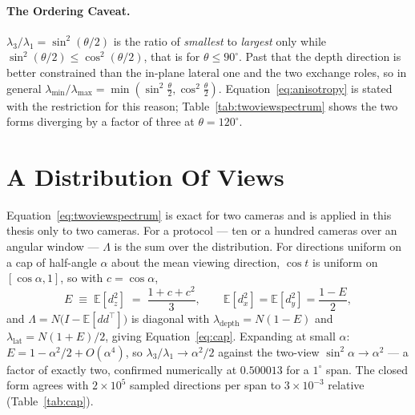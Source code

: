 \paragraph{The Ordering Caveat.} $\lambda_3/\lambda_1 = \sin^2(\theta/2)$ is the
ratio of \emph{smallest} to \emph{largest} only while
$\sin^2(\theta/2) \le \cos^2(\theta/2)$, that is for $\theta \le 90^\circ$. Past
that the depth direction is better constrained than the in-plane lateral one and
the two exchange roles, so in general
$\lambda_{\min}/\lambda_{\max} = \min(\sin^2\tfrac\theta2, \cos^2\tfrac\theta2)$.
Equation~\eqref{eq:anisotropy} is stated with the restriction for this reason;
Table~\ref{tab:twoviewspectrum} shows the two forms diverging by a factor of
three at $\theta = 120^\circ$.

\section{A Distribution Of Views}
\label{app:cap}
Equation~\eqref{eq:twoviewspectrum} is exact for two cameras and is applied in
this thesis only to two cameras. For a protocol --- ten or a hundred cameras over
an angular window --- $\Lambda$ is the sum over the distribution. For directions
uniform on a cap of half-angle $\alpha$ about the mean viewing direction,
$\cos t$ is uniform on $[\cos\alpha, 1]$, so with $c = \cos\alpha$,
\begin{equation}
  E \;\equiv\; \mathbb{E}[d_z^2] \;=\; \frac{1+c+c^2}{3},
  \qquad
  \mathbb{E}[d_x^2] = \mathbb{E}[d_y^2] = \frac{1-E}{2},
\end{equation}
and $\Lambda = N\big(I - \mathbb{E}[dd^{\!\top}]\big)$ is diagonal with
$\lambda_{\mathrm{depth}} = N(1-E)$ and $\lambda_{\mathrm{lat}} = N(1+E)/2$,
giving Equation~\eqref{eq:cap}. Expanding at small $\alpha$: $E = 1 -
\alpha^2/2 + O(\alpha^4)$, so $\lambda_3/\lambda_1 \to \alpha^2/2$ against the
two-view $\sin^2\alpha \to \alpha^2$ --- a factor of exactly two, confirmed
numerically at $0.500013$ for a $1^\circ$ span. The closed form agrees with
$2\times10^5$ sampled directions per span to $3\times10^{-3}$ relative
(Table~\ref{tab:cap}).

